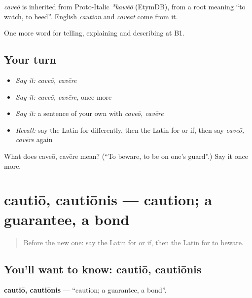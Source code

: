 \begin{cousinweb}
\emph{caveō} is inherited from Proto-Italic \emph{*kawēō} (EtymDB), from a root meaning \textquotedblleft{}to watch, to heed\textquotedblright{}. English \emph{caution} and \emph{caveat} come from it.
\end{cousinweb}

\begin{grammarlens}[title={What you've built}]
One more word for telling, explaining and describing at B1.
\end{grammarlens}

\subsection*{Your turn}
\begin{itemize}
\raggedright
  \item \emph{Say it:} \emph{caveō, cavēre}
  \item \emph{Say it:} \emph{caveō, cavēre}, once more
  \item \emph{Say it:} a sentence of your own with \emph{caveō, cavēre}
  \item \emph{Recall:} say the Latin for differently, then the Latin for or if, then say \emph{caveō, cavēre} again
\end{itemize}

\begin{tcolorbox}[breakable,colback=teal!4,colframe=teal!35!black,title={Before you move on}]
What does caveō, cavēre mean? (\textquotedblleft{}To beware, to be on one's guard\textquotedblright{}.) Say it once more.
\end{tcolorbox}
\section[cautiō, cautiōnis]{cautiō, cautiōnis — caution; a guarantee, a bond}

\label{lesson:LA-C392-cautio}



\begin{quote}
Before the new one: say the Latin for or if, then the Latin for to beware.
\end{quote}

\subsection*{You'll want to know: cautiō, cautiōnis}
\textbf{cautiō, cautiōnis} — \textquotedblleft{}caution; a guarantee, a bond\textquotedblright{}.

